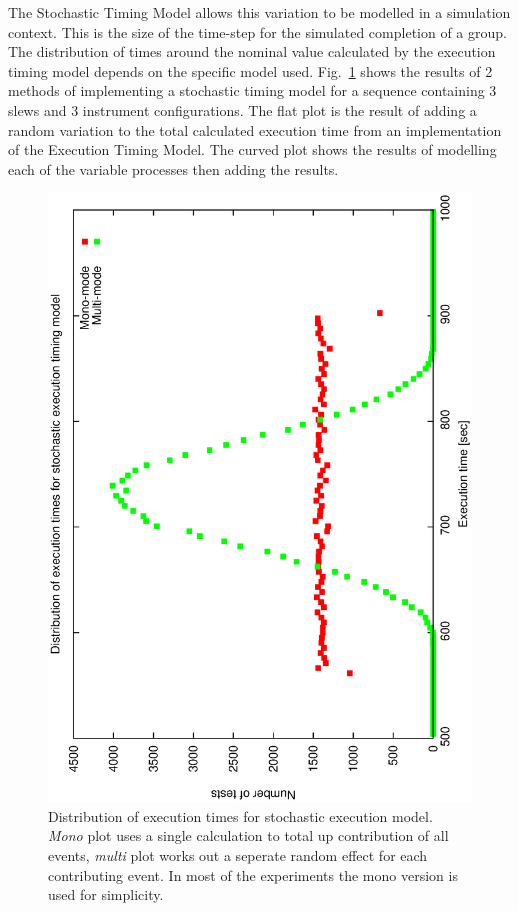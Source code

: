 The Stochastic Timing Model allows this variation to be modelled in a simulation context. This is the size of the time-step for the simulated completion of a group. The distribution of times around the nominal value calculated by the execution timing model  depends on the specific model used. Fig.~\ref{fig:simf_exec_timing_dist} shows the results of 2 methods of implementing a stochastic timing model for a sequence containing 3 slews and 3 instrument configurations. The flat plot is the result of adding a random variation to the total calculated execution time from an implementation of the Execution Timing Model. The curved plot shows the results of modelling each of the variable processes then adding the results.

\begin{figure}[h]
\begin{center}
  \includegraphics[scale=0.5, angle=-90]{figures/simf_exec_plot.eps}
\caption[Distribution of execution times for stochastic execution model]
{Distribution of execution times for stochastic execution model. \emph{Mono} plot uses a single calculation to total up contribution of all events, \emph{multi} plot works out a seperate random effect for each contributing event. In most of the experiments the mono version is used for simplicity.}
 \label{fig:simf_exec_timing_dist}
\end{center}
\end{figure}

